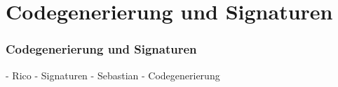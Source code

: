 \section{Codegenerierung und Signaturen}

\begin{frame}
\frametitle{Codegenerierung und Signaturen}
    - Rico - Signaturen
    - Sebastian - Codegenerierung
\end{frame}
